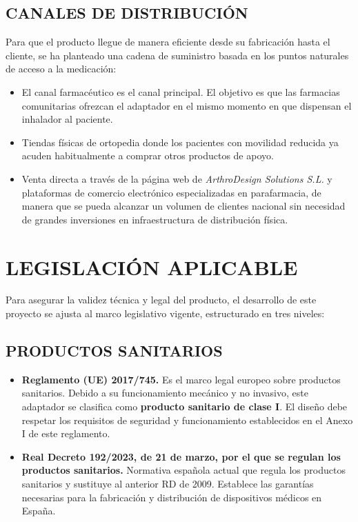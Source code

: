 \documentclass[11pt,a4paper]{article}
\begin{document}
\subsection{CANALES DE DISTRIBUCIÓN}
Para que el producto llegue de manera eficiente desde su fabricación hasta el cliente, se ha planteado una cadena de suministro basada en los puntos naturales de acceso a la medicación:
\begin{itemize}
    \item El canal farmacéutico es el canal principal. El objetivo es que las farmacias comunitarias ofrezcan el adaptador en el mismo momento en que dispensan el inhalador al paciente.
    \item Tiendas físicas de ortopedia donde los pacientes con movilidad reducida ya acuden habitualmente a comprar otros productos de apoyo.
    \item Venta directa a través de la página web de \textit{ArthroDesign Solutions S.L.} y plataformas de comercio electrónico especializadas en parafarmacia, de manera que se pueda alcanzar un volumen de clientes nacional sin necesidad de grandes inversiones en infraestructura de distribución física.
\end{itemize}


\section{LEGISLACIÓN APLICABLE}
Para asegurar la validez técnica y legal del producto, el desarrollo de este proyecto se ajusta al marco legislativo vigente, estructurado en tres niveles: 



\subsection{PRODUCTOS SANITARIOS}
\begin{itemize}
    \item \textbf{Reglamento (UE) 2017/745.} Es el marco legal europeo sobre productos sanitarios. Debido a su funcionamiento mecánico y no invasivo, este adaptador se clasifica como \textbf{producto sanitario de clase I}. El diseño debe respetar los requisitos de seguridad y funcionamiento establecidos en el Anexo I de este reglamento.
    \item \textbf{Real Decreto 192/2023, de 21 de marzo, por el que se regulan los productos sanitarios.} Normativa española actual que regula los productos sanitarios y sustituye al anterior RD de 2009. Establece las garantías necesarias para la fabricación y distribución de dispositivos médicos en España.
\end{itemize}
\end{document}
